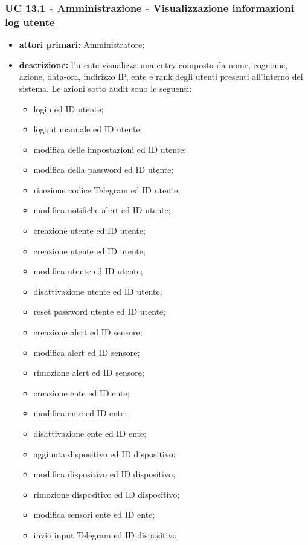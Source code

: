 		\subsubsection{UC 13.1 - Amministrazione - Visualizzazione informazioni log utente}
		\begin{itemize}
			\item \textbf{attori primari:} Amministratore;
			\item \textbf{descrizione:} l'utente visualizza una entry composta da nome, cognome, azione, data-ora, indirizzo IP, ente e rank degli utenti presenti all'interno del sistema. Le azioni sotto audit sono le seguenti: 
			
			\begin{itemize}
				\item login ed ID utente;
				\item logout manuale ed ID utente;
				\item modifica delle impostazioni ed ID utente;
				\item modifica della password ed ID utente;
				\item ricezione codice Telegram ed ID utente;
				\item modifica notifiche alert ed ID utente;
				\item creazione utente ed ID utente;
				\item creazione utente ed ID utente;
				\item modifica utente ed ID utente;
				\item disattivazione utente ed ID utente;
				\item reset password utente ed ID utente;
				\item creazione alert ed ID sensore;
				\item modifica alert ed ID sensore;
				\item rimozione alert ed ID sensore;
				\item creazione ente ed ID ente;
				\item modifica ente ed ID ente;
				\item disattivazione ente ed ID ente;
				\item aggiunta dispositivo ed ID dispositivo;
				\item modifica dispositivo ed ID dispositivo;
				\item rimozione dispositivo ed ID dispositivo;
				\item modifica sensori ente ed ID ente;
				\item invio input Telegram ed ID dispositivo;
			\end{itemize}
			

\end{itemize}

